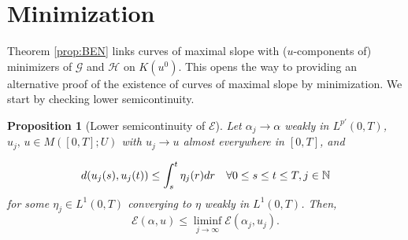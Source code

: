 \documentclass[10pt,a4paper]{amsart}
\newcommand{\Nz}{\mathbb{N}}
\newcommand{\dr}{{\rm d} r}
\newcommand{\GG}{{\mathcal G}}
\newcommand{\EE}{{\mathcal E}}
\newcommand{\HH}{{\mathcal H}}
\newtheorem{proposition}[theorem]{Proposition}
\begin{document}

\section{Minimization} \label{sec:minimization}
 
 Theorem  \ref{prop:BEN} links curves of maximal slope with
($u$-components of) minimizers of $\GG$  and $\HH$  
on $K(u^0)$. This opens
the way  to   providing an alternative proof of the existence of curves
of maximal slope by minimization. We start by checking lower
semicontinuity.
 


\begin{proposition}[Lower semicontinuity of $\EE$]\label{prop:BBlsc}
   Let  $\alpha_j \to \alpha$ weakly in $L^{ p'}(0,T)$, $u_j, \, u \in
   M  ([0,T];U)$ with  $u_j\to u$ almost everywhere in
  $[0,T]$,     and 
  
  \[
 d(u_j(s), u_j(t)) \le \int_s^t \eta_j(r) \dr \quad \forall 0 \le s \le t \le T, j \in \Nz
  \]
   for some $\eta_j \in L^1(0,T)$ converging to $\eta$ weakly in $L^1(0,T)$.  Then, 
  \begin{equation*}
    \EE (\alpha,u)\leq \liminf_{j\to \infty} \EE(\alpha_j,u_j).
  \end{equation*} 
\end{proposition}
\end{document}
